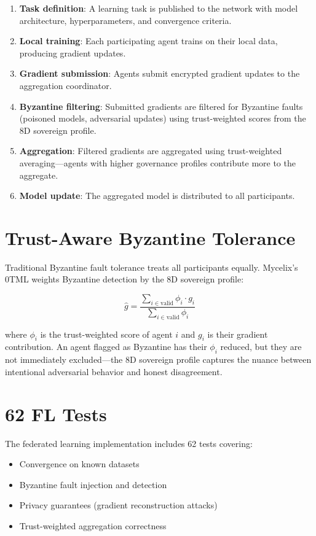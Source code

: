\documentclass[12pt]{book}
\begin{document}
\begin{enumerate}
  \item \textbf{Task definition}: A learning task is published to the network
    with model architecture, hyperparameters, and convergence criteria.
  \item \textbf{Local training}: Each participating agent trains on their local
    data, producing gradient updates.
  \item \textbf{Gradient submission}: Agents submit encrypted gradient updates
    to the aggregation coordinator.
  \item \textbf{Byzantine filtering}: Submitted gradients are filtered for
    Byzantine faults (poisoned models, adversarial updates) using
    trust-weighted scores from the 8D sovereign profile.
  \item \textbf{Aggregation}: Filtered gradients are aggregated using
    trust-weighted averaging---agents with higher governance profiles
    contribute more to the aggregate.
  \item \textbf{Model update}: The aggregated model is distributed to all
    participants.
\end{enumerate}

\section{Trust-Aware Byzantine Tolerance}

Traditional Byzantine fault tolerance treats all participants equally.
Mycelix's 0TML weights Byzantine detection by the 8D sovereign profile:

\begin{equation}
  \hat{g} = \frac{\sum_{i \in \text{valid}} \phi_i \cdot g_i}{\sum_{i \in \text{valid}} \phi_i}
\end{equation}

where $\phi_i$ is the trust-weighted score of agent $i$ and $g_i$ is their
gradient contribution. An agent flagged as Byzantine has their $\phi_i$ reduced,
but they are not immediately excluded---the 8D sovereign profile captures the nuance
between intentional adversarial behavior and honest disagreement.

\section{62 FL Tests}

The federated learning implementation includes 62 tests covering:
\begin{itemize}
  \item Convergence on known datasets
  \item Byzantine fault injection and detection
  \item Privacy guarantees (gradient reconstruction attacks)
  \item Trust-weighted aggregation correctness
\end{itemize}
\end{document}

